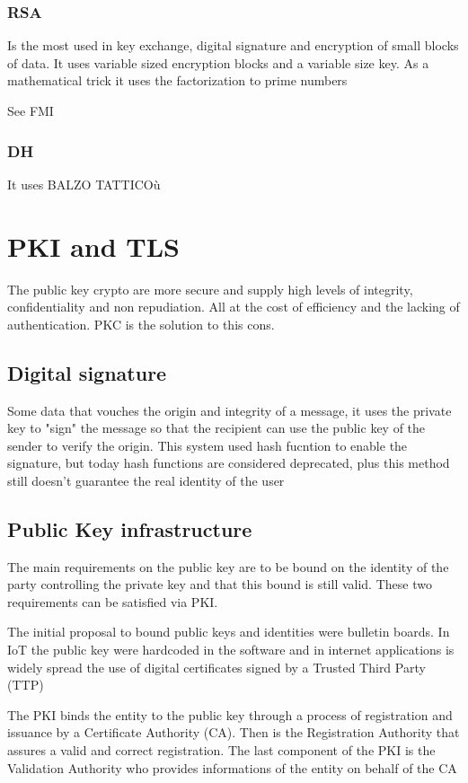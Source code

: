 \documentclass[12pt, a4paper]{article}
\begin{document}
\subsubsection{RSA}
Is the most used in key exchange, digital signature and encryption of small blocks of data. It uses variable sized 
encryption blocks and a variable size key. As a mathematical trick it uses the factorization to prime numbers

See FMI

\subsubsection{DH}
It uses 
BALZO TATTICOù

\newpage
\section{PKI and TLS}
The public key crypto are more secure and supply high levels of integrity, confidentiality and non repudiation.
All at the cost of efficiency and the lacking of authentication. PKC is the solution to this cons.

\subsection{Digital signature}
Some data that vouches the origin and integrity of a message, it uses the private key to "sign" the message so that 
the recipient can use the public key of the sender to verify the origin. This system used hash fucntion to enable 
the signature, but today hash functions are considered deprecated, plus this method still doesn't guarantee the 
real identity of the user

\subsection{Public Key infrastructure}
The main requirements on the public key are to be bound on the identity of the party controlling the private key and
that this bound is still valid. These two requirements can be satisfied via PKI.

The initial proposal to bound public keys and identities were bulletin boards. In IoT the public key were hardcoded
in the software and in internet applications is widely spread the use of digital certificates signed by a Trusted 
Third Party (TTP)

The PKI binds the entity to the public key through a process of registration and issuance by a Certificate 
Authority (CA). Then is the Registration Authority that assures a valid and correct registration. The last component
of the PKI is the Validation Authority who provides informations of the entity on behalf of the CA
\end{document}
